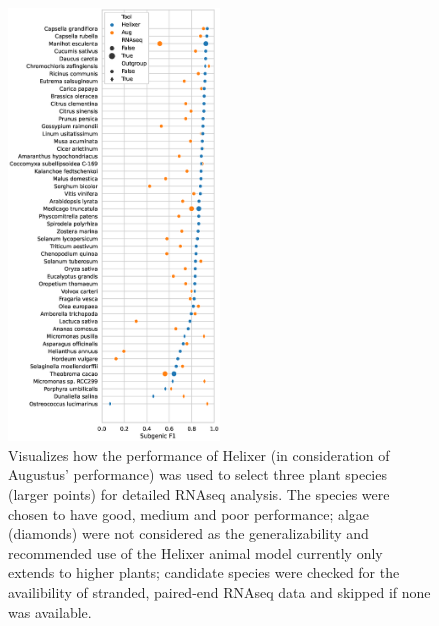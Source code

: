 \documentclass{article}
\begin{document}
\clearpage
\begin{figure}[!hbt]
\label{supfig:rna_select_plants}
\centerline{\includegraphics[width=0.5\textwidth]{images/RNAseq_plants}}
\caption{Visualizes how the performance of Helixer (in consideration of Augustus' performance)
was used to select three plant species (larger points) for detailed RNAseq analysis. The 
species were chosen to have good, medium and poor performance; algae (diamonds) were
not considered as the generalizability and recommended use of the Helixer animal model
currently only extends to higher plants; candidate species were checked for the availibility of
stranded, paired-end RNAseq data and skipped if none was available.}
\end{figure}
\clearpage
\end{document}
